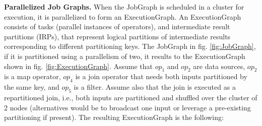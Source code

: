 \documentclass[11pt]{article}
\begin{document}
\textbf{Parallelized Job Graphs.} When the JobGraph is scheduled in a cluster for execution, it is parallelized to form an ExecutionGraph. An ExecutionGraph consists of tasks (parallel instances of operators), and intermediate result partitions (IRPs), that represent logical partitions of intermediate results corresponding to different partitioning keys. The JobGraph in fig. \ref{fig:JobGraph}, if it is partitioned using a parallelism of two, it results to the ExecutionGraph shown in fig. \ref{fig:ExecutionGraph}. Assume that $op_1$ and $op_2$ are data sources, $op_2$ is a map operator, $op_4$ is a join operator that needs both inputs partitioned by the same key, and $op_5$ is a filter. Assume also that the join is executed as a repartitioned join, i.e., both inputs are partitioned and shuffled over the cluster of 2 nodes (alternatives would be to broadcast one input or leverage a pre-existing partitioning if present). The resulting ExecutionGraph is the following:
\end{document}
